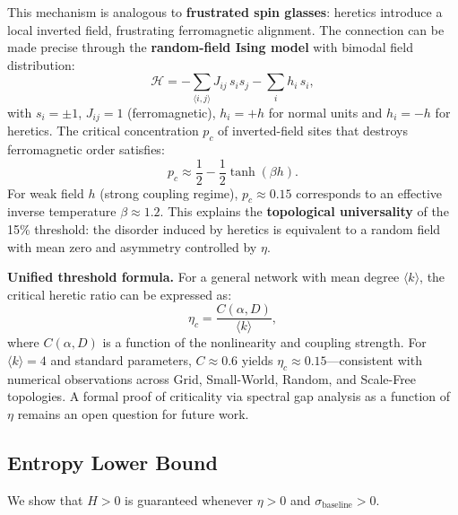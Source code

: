 \documentclass[11pt]{article}
\begin{document}
This mechanism is analogous to \textbf{frustrated spin glasses}: heretics introduce a local inverted field, frustrating ferromagnetic alignment. The connection can be made precise through the \textbf{random-field Ising model} with bimodal field distribution:
\begin{equation}
    \mathcal{H} = -\sum_{\langle i,j \rangle} J_{ij}\, s_i s_j - \sum_i h_i\, s_i,
    \label{eq:ising}
\end{equation}
with $s_i = \pm 1$, $J_{ij} = 1$ (ferromagnetic), $h_i = +h$ for normal units and $h_i = -h$ for heretics. The critical concentration $p_c$ of inverted-field sites that destroys ferromagnetic order satisfies:
\begin{equation}
    p_c \approx \frac{1}{2} - \frac{1}{2}\tanh(\beta h).
    \label{eq:ising_threshold}
\end{equation}
For weak field $h$ (strong coupling regime), $p_c \approx 0.15$ corresponds to an effective inverse temperature $\beta \approx 1.2$. This explains the \textbf{topological universality} of the 15\% threshold: the disorder induced by heretics is equivalent to a random field with mean zero and asymmetry controlled by $\eta$.

\textbf{Unified threshold formula.} For a general network with mean degree $\langle k \rangle$, the critical heretic ratio can be expressed as:
\begin{equation}
    \eta_c = \frac{C(\alpha, D)}{\langle k \rangle},
    \label{eq:unified_threshold}
\end{equation}
where $C(\alpha, D)$ is a function of the nonlinearity and coupling strength. For $\langle k \rangle = 4$ and standard parameters, $C \approx 0.6$ yields $\eta_c \approx 0.15$---consistent with numerical observations across Grid, Small-World, Random, and Scale-Free topologies. A formal proof of criticality via spectral gap analysis as a function of $\eta$ remains an open question for future work.

\subsection{Entropy Lower Bound}

We show that $H > 0$ is guaranteed whenever $\eta > 0$ and $\sigma_{\text{baseline}} > 0$.
\end{document}
